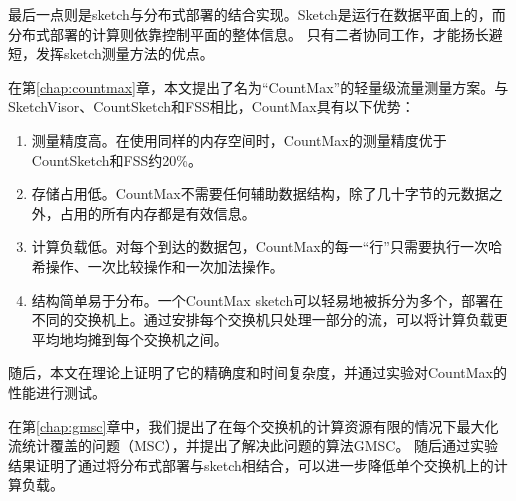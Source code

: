 最后一点则是sketch与分布式部署的结合实现。Sketch是运行在数据平面上的，而分布式部署的计算则依靠控制平面的整体信息。
只有二者协同工作，才能扬长避短，发挥sketch测量方法的优点。

在第\ref{chap:countmax}章，本文提出了名为“CountMax”的轻量级流量测量方案。与SketchVisor、CountSketch和FSS相比，CountMax具有以下优势：
\begin{enumerate}
    \item 测量精度高。在使用同样的内存空间时，CountMax的测量精度优于CountSketch和FSS约20\%。
    \item 存储占用低。CountMax不需要任何辅助数据结构，除了几十字节的元数据之外，占用的所有内存都是有效信息。
    \item 计算负载低。对每个到达的数据包，CountMax的每一“行”只需要执行一次哈希操作、一次比较操作和一次加法操作。
    \item 结构简单易于分布。一个CountMax sketch可以轻易地被拆分为多个，部署在不同的交换机上。通过安排每个交换机只处理一部分的流，可以将计算负载更平均地均摊到每个交换机之间。
\end{enumerate}
随后，本文在理论上证明了它的精确度和时间复杂度，并通过实验对CountMax的性能进行测试。

在第\ref{chap:gmsc}章中，我们提出了在每个交换机的计算资源有限的情况下最大化流统计覆盖的问题（MSC），并提出了解决此问题的算法GMSC。
随后通过实验结果证明了通过将分布式部署与sketch相结合，可以进一步降低单个交换机上的计算负载。



